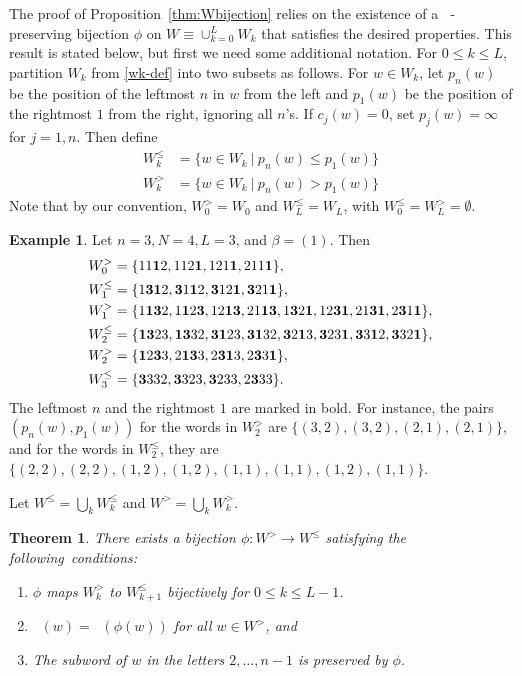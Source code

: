\documentclass[11pt]{article}
\newtheorem{theorem}[theo]{Theorem}
\theoremstyle{definition}
\newtheorem{example}[theo]{Example}
\numberwithin{equation}{section}
\DeclareMathOperator{\quinvL}{\quinv^{(\ell)}}
\DeclareMathOperator{\quinv}{quinv}
\begin{document}
The proof of Proposition~\ref{thm:Wbijection} relies on the existence of a $\quinvL$-preserving bijection $\phi$ on $W \equiv \cup_{k=0}^L W_k$ that satisfies the desired properties. This result is stated below, but first we need some additional notation. For $0 \leq k \leq L$, partition $W_k$ from \eqref{wk-def} into two subsets as follows. For $w \in W_k$, let $p_n(w)$ be the position of the leftmost $n$ in $w$ from the left and $p_1(w)$ be the position of the rightmost $1$ from the right, ignoring all $n$'s. If $c_j(w)=0$, set $p_j(w)=\infty$ for $j=1,n$. Then define
\begin{align*}
W_k^{\leq}& = \{w\in W_k\ |\ p_n(w) \leq p_1(w)\} \\
W_k^>&= \{w\in W_k\ |\ p_n(w) > p_1(w)\}
\end{align*}
Note that by our convention, $W_0^>=W_0$ and $W_L^\leq=W_L$, with $W_0^\leq=W_L^>=\emptyset$.  
\begin{example}\label{Wkleq-eg}
Let $n=3, N=4, L=3$, and $\beta=(1)$. Then
\begin{align*}
W_0^>&=\{11{\bf1}2,112{\bf1},121{\bf1},211{\bf1}\},\\
W_1^\leq&=\{1{\bf31}2,{\bf3}1{\bf1}2,{\bf3}12{\bf1}, {\bf3}21{\bf1}\},\\
W_1^>&=\{1{\bf13}2, 1{\bf1}2{\bf3},12{\bf13},21{\bf13}, 1{\bf3}2{\bf1},12{\bf31},21{\bf31},2{\bf3}1{\bf1} \}, \\
W_2^\leq &= \{{\bf1 3} 2 3 ,  {\bf1 3} 3 2 ,  {\bf3 1} 2 3,  {\bf3 1} 3 2 ,  {\bf3} 2 {\bf1} 3 ,  {\bf3} 2 3 {\bf1} ,  {\bf3} 3 {\bf1} 2 ,  {\bf3} 3 2 {\bf1} \}, \\
W_2^> &= \{{\bf1}2{\bf3}3, 2{\bf13}3, 2{\bf31}3, 2{\bf3}3{\bf1}\},\\
W_3^\leq &= \{{\bf3}332,{\bf3}323,{\bf3}233,2{\bf3}33\}.
\end{align*}
The leftmost $n$ and the rightmost $1$ are marked in bold. For instance, the pairs $(p_n(w),p_1(w))$ for the words in $W_2^>$ are $\{(3,2), (3,2), (2,1), (2,1)\}$, and for the words in $W_2^\leq$, they are $\{(2,2), (2,2),(1,2),(1,2),(1,1),(1,1),(1,2),(1,1)\}$.
\end{example}

Let $W^\leq = \bigcup_k W_k^\leq$ and $W^> = \bigcup_k W_k^>$. 

\begin{theorem}\label{thm:invol}
There exists a bijection $\phi : W^> \to W^\leq$ satisfying the
following~conditions:
\begin{enumerate}[label=(\arabic*)]
\item \label{it1vvt1} $\phi$ maps $W_k^>$ to $W_{k+1}^\leq$ bijectively for $0 \leq k \leq L-1$.
\item \label{it1vvt2} $\quinvL(w) = \quinvL(\phi(w))$ for all $w \in W^>$, and
\item \label{it1vvt3} The subword of $w$ in the letters $2, \dots, n-1$ is preserved by 
$\phi$.
\end{enumerate}
\end{theorem}
\end{document}

